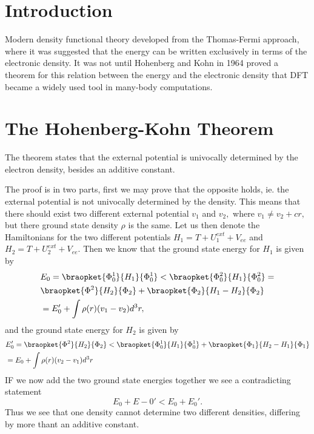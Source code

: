 \documentclass[a4paper,10pt,english]{article}%
\begin{document}
\section{Introduction}
Modern density functional theory developed from the Thomas-Fermi approach, where
it was suggested that the energy can be written exclusively in terms of the 
electronic density. It was not until Hohenberg and Kohn in 1964 proved a theorem
for this relation between the energy and the electronic density that DFT became
a widely used tool in many-body computations.

\section{The Hohenberg-Kohn Theorem}
The theorem states that the external potential is univocally determined by the 
electron density, besides an additive constant.

The proof is in two parts, first we may prove that the opposite holds, ie. the
external potential is not univocally determined by the density. This means that
there should exist two different external potential $v_1$ and $v_2,$ where
$v_1\neq v_2 +cr,$ but there ground state density $\rho$ is the same. Let us
then denote the Hamiltonians for the two different potentials $H_1=T+U^{ext}_1+V_{ee}$ and $H_2=T+U^{ext}_2+V_{ee}.$ Then we know that the ground state
energy for $H_1$ is given by 
\begin{equation*}
        \begin{split}
                &E_0=\braopket{\Phi^1_0}{H_1}{\Phi^1_{0}}<\braopket{\Phi^2_0}{H_1}{\Phi^2_0}=\\
                &\braopket{\Phi^2}{H_2}{\Phi_2}+\braopket{\Phi_2}{H_1-H_2}{\Phi_2}\\
                &=E_0'+\int\rho(r)(v_1-v_2)d^3r,
        \end{split}
\end{equation*}
 and the ground state energy for $H_2$ is given by
\begin{equation*}
        \begin{split}
                &E_0'=\braopket{\Phi^2}{H_2}{\Phi_2}<\braopket{\Phi^1_0}{H_1}{\Phi^1_{0}}+\braopket{\Phi_1}{H_2-H_1}{\Phi_1}\\
                &=E_0+\int\rho(r)(v_2-v_1)d^3r
        \end{split}
        \label{sc1eq:1}
\end{equation*}
IF we now add the two ground state energies together we see a contradicting 
statement
\begin{equation*}
       E_0+E-0'<E_0+E_0'.
        \label{sqeq:contr}
\end{equation*}
Thus we see that one density cannot determine two different densities, differing
by more thant an additive constant.
\end{document}
